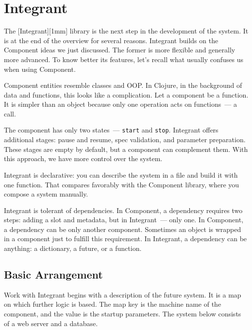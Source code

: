 \section{Integrant}


The [Integrant][1mm] library is the next step in the development of the system. It is at the end of the overview for several reasons. Integrant builds on the Component ideas we just discussed. The former is more flexible and generally more advanced. To know better its features, let's recall what usually confuses us when using Component.


Component entities resemble classes and OOP. In Clojure, in the background of data and functions, this looks like a complication. Let a component be a function. It is simpler than an object because only one operation acts on functions~--- a call.

The component has only two states~--- \verb|start| and \verb|stop|. Integrant offers additional stages: pause and resume, spec validation, and parameter preparation. These stages are empty by default, but a component can complement them. With this approach, we have more control over the system.


Integrant is declarative: you can describe the system in a file and build it with one function. That compares favorably with the Component library, where you compose a system manually.

Integrant is tolerant of dependencies. In Component, a dependency requires two steps: adding a slot and metadata, but in Integrant~--- only one. In Component, a dependency can be only another component. Sometimes an object is wrapped in a component just to fulfill this requirement. In Integrant, a dependency can be anything: a dictionary, a future, or a function.

\subsection{Basic Arrangement}

Work with Integrant begins with a description of the future system. It is a map on which further logic is based. The map key is the machine name of the component, and the value is the startup parameters. The system below consists of a web server and a database.

